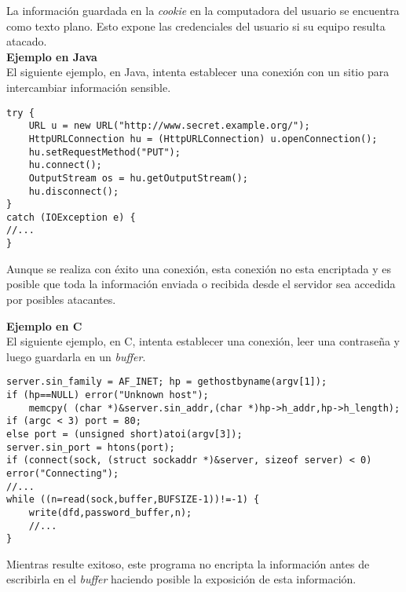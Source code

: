 La información guardada en la \textit{cookie} en la computadora del usuario se encuentra como texto plano.
Esto expone las credenciales del usuario si su equipo resulta atacado. \\

\noindent \textbf{Ejemplo en Java}\\

El siguiente ejemplo, en Java, intenta establecer una conexión con un sitio para intercambiar información sensible.

\begin{lstlisting}[frame=single]
try {
	URL u = new URL("http://www.secret.example.org/");
	HttpURLConnection hu = (HttpURLConnection) u.openConnection();
	hu.setRequestMethod("PUT");
	hu.connect();
	OutputStream os = hu.getOutputStream();
	hu.disconnect();
}
catch (IOException e) {
//...
}
\end{lstlisting}

Aunque se realiza con éxito una conexión, esta conexión no esta encriptada y es posible que toda la información enviada o recibida desde el servidor sea accedida por posibles atacantes.

\noindent \textbf{Ejemplo en C}\\

El siguiente ejemplo, en C, intenta establecer una conexión, leer una contraseña y luego guardarla en un \textit{buffer}.

\begin{lstlisting}[frame=single]
server.sin_family = AF_INET; hp = gethostbyname(argv[1]);
if (hp==NULL) error("Unknown host");
    memcpy( (char *)&server.sin_addr,(char *)hp->h_addr,hp->h_length);
if (argc < 3) port = 80;
else port = (unsigned short)atoi(argv[3]);
server.sin_port = htons(port);
if (connect(sock, (struct sockaddr *)&server, sizeof server) < 0) error("Connecting");
//...
while ((n=read(sock,buffer,BUFSIZE-1))!=-1) {
	write(dfd,password_buffer,n);
	//...
}
\end{lstlisting}

Mientras resulte exitoso, este programa no encripta la información antes de escribirla en el \textit{buffer} haciendo posible la exposición de esta información.

